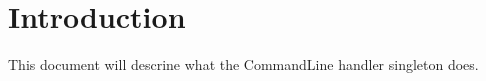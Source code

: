 \documentclass[a4paper, 11pt]{article}
\begin{document}
\section{Introduction}

This document will descrine what the CommandLine handler singleton does.
\end{document}
